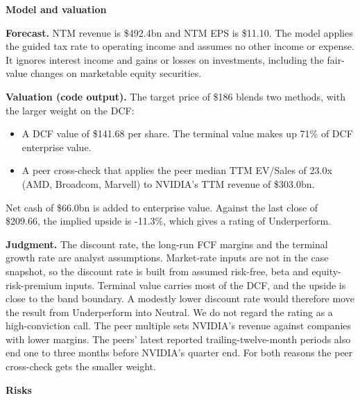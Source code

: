 \documentclass[a4paper,10pt]{article}
\begin{document}
\par\smallskip\textbf{\color{MemoBlue}Model and valuation}\par

\textbf{Forecast.} NTM revenue is \$492.4bn and NTM EPS is \$11.10. The model applies the guided tax rate to operating income and assumes no other income or expense. It ignores interest income and gains or losses on investments, including the fair-value changes on marketable equity securities.

\textbf{Valuation (code output).} The target price of \$186 blends two methods, with the larger weight on the DCF:

\begin{itemize}\setlength{\itemsep}{1pt}
\item A DCF value of \$141.68 per share. The terminal value makes up 71\% of DCF enterprise value.
\item A peer cross-check that applies the peer median TTM EV/Sales of 23.0x (AMD, Broadcom, Marvell) to NVIDIA's TTM revenue of \$303.0bn.
\end{itemize}

Net cash of \$66.0bn is added to enterprise value. Against the last close of \$209.66, the implied upside is -11.3\%, which gives a rating of Underperform.

\textbf{Judgment.} The discount rate, the long-run FCF margins and the terminal growth rate are analyst assumptions. Market-rate inputs are not in the case snapshot, so the discount rate is built from assumed risk-free, beta and equity-risk-premium inputs. Terminal value carries most of the DCF, and the upside is close to the band boundary. A modestly lower discount rate would therefore move the result from Underperform into Neutral. We do not regard the rating as a high-conviction call. The peer multiple sets NVIDIA's revenue against companies with lower margins. The peers' latest reported trailing-twelve-month periods also end one to three months before NVIDIA's quarter end. For both reasons the peer cross-check gets the smaller weight.

\par\smallskip\textbf{\color{MemoBlue}Risks}\par
\end{document}
